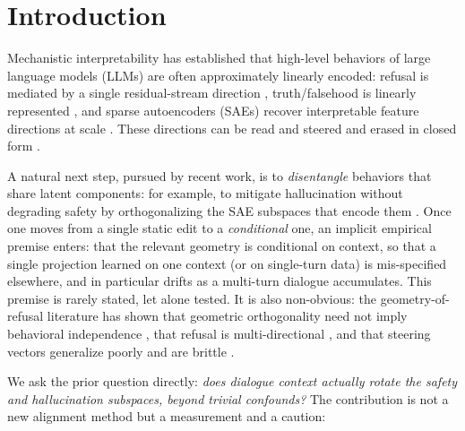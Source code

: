 \documentclass{article}
\begin{document}
\section{Introduction}
\label{sec:intro}

Mechanistic interpretability has established that high-level behaviors of large language
models (LLMs) are often approximately linearly encoded: refusal is mediated by a single
residual-stream direction \citep{arditi2024refusal}, truth/falsehood is linearly
represented \citep{marks2023geometry}, and sparse autoencoders (SAEs) recover
interpretable feature directions at scale \citep{bricken2023monosemanticity,
templeton2024scaling, lieberum2024gemmascope}. These directions can be read and steered
\citep{zou2023repe, li2023iti, panickssery2024caa} and erased in closed form
\citep{ravfogel2020inlp, belrose2023leace}.

A natural next step, pursued by recent work, is to \emph{disentangle} behaviors that
share latent components: for example, to mitigate hallucination without degrading safety
by orthogonalizing the SAE subspaces that encode them \citep{mahmoud2025unintended}. Once
one moves from a single static edit to a \emph{conditional} one, an implicit empirical
premise enters: that the relevant geometry is conditional on context, so that a single
projection learned on one context (or on single-turn data) is mis-specified elsewhere,
and in particular drifts as a multi-turn dialogue accumulates. This premise is rarely
stated, let alone tested. It is also non-obvious: the geometry-of-refusal literature has
shown that geometric orthogonality need not imply behavioral independence
\citep{wollschlager2025geometry}, that refusal is multi-directional \citep{pan2025hidden},
and that steering vectors generalize poorly and are brittle \citep{tan2024steering}.

We ask the prior question directly: \emph{does dialogue context actually rotate the
safety and hallucination subspaces, beyond trivial confounds?} The contribution is not a
new alignment method but a measurement and a caution:
\end{document}
